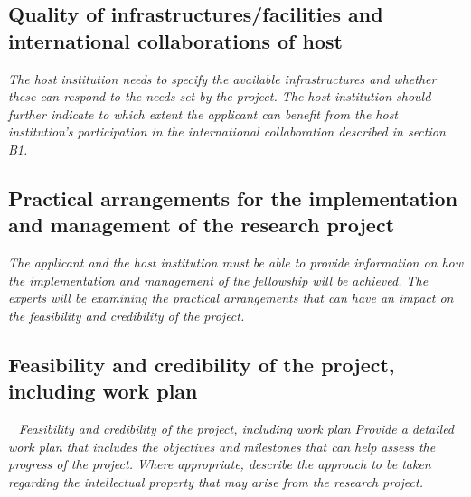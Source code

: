 \documentclass[a4paper,11pt]{article}
\newenvironment{xcomment}{\em}{}
\begin{document}
\subsection{Quality of infrastructures/facilities and international collaborations of host}
\begin{xcomment}
  The host institution needs to specify the available infrastructures and whether these can respond
  to the needs set by the project. The host institution should further indicate to which extent the
  applicant can benefit from the host institution's participation in the international collaboration
  described in section B1.
\end{xcomment}

\subsection{Practical arrangements for the implementation and management of the research project }
\begin{xcomment}
  The applicant and the host institution must be able to provide information on how the
  implementation and management of the fellowship will be achieved. The experts will be
  examining the practical arrangements that can have an impact on the feasibility and credibility of
  the project.
\end{xcomment}

\subsection{Feasibility and credibility of the project, including work plan}\
\begin{xcomment}
 Feasibility and credibility of the project, including work plan
Provide a detailed work plan that includes the objectives and milestones that can help assess the
progress of the project. Where appropriate, describe the approach to be taken regarding the
intellectual property that may arise from the research project.
\end{xcomment}

\end{document}
